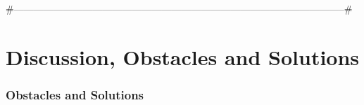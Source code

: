 \documentclass[serif,mathserif]{beamer}
\begin{document}
#-----------------------------------------------------------------------------------------------------#






\section{Discussion, Obstacles and Solutions}
\begin{frame}
\frametitle{Obstacles and Solutions}

\end{frame}
\end{document}
